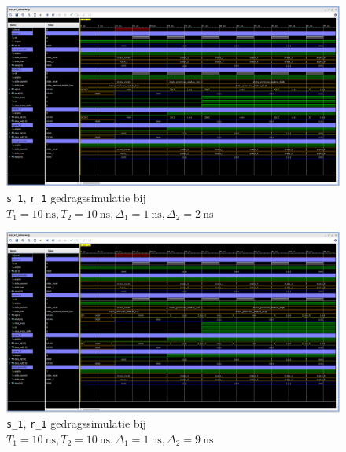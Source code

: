 \documentclass[titlepage]{article}
\begin{document}
\begin{figure}[htpb]
    \centering
    \includegraphics[trim={0 100px 0 0}, clip, width =\linewidth]{sr1_gedragssimulatie_10_10_1_2.PNG}
    \caption{\texttt{s\_1}, \texttt{r\_1} gedragssimulatie bij \(T_1 = \SI{10}{\nano\second}, T_2 = \SI{10}{\nano\second}, \Delta_1 = \SI{1}{\nano\second}, \Delta_2 = \SI{2}{\nano\second} \)}
    \label{fig:sr1_behav_10_10_1_2}
\end{figure}

\begin{figure}[htpb]
    \centering
    \includegraphics[trim={0 100px 0 0}, clip, width =\linewidth]{sr1_gedragssimulatie_10_10_1_9.PNG}
    \caption{\texttt{s\_1}, \texttt{r\_1} gedragssimulatie bij \(T_1 = \SI{10}{\nano\second}, T_2 = \SI{10}{\nano\second}, \Delta_1 = \SI{1}{\nano\second}, \Delta_2 = \SI{9}{\nano\second} \)}
    \label{fig:sr1_behav_10_10_1_9}
\end{figure}
\end{document}
